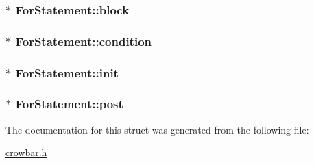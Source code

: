 \subsubsection[{block}]{$\ast$ For\+Statement\+::block}\label{struct_for_statement_a482b9507e4e7064b2a3449106528d422}
\hypertarget{struct_for_statement_ada11b70a235641ef62d953293d00d7ba}{}
\subsubsection[{condition}]{$\ast$ For\+Statement\+::condition}\label{struct_for_statement_ada11b70a235641ef62d953293d00d7ba}
\hypertarget{struct_for_statement_ad651b9f23924d2f0aa19d4269353b526}{}
\subsubsection[{init}]{$\ast$ For\+Statement\+::init}\label{struct_for_statement_ad651b9f23924d2f0aa19d4269353b526}
\hypertarget{struct_for_statement_a17a10be0a7696c064a0aa7e55e680903}{}
\subsubsection[{post}]{$\ast$ For\+Statement\+::post}\label{struct_for_statement_a17a10be0a7696c064a0aa7e55e680903}


The documentation for this struct was generated from the following file\+:\begin{DoxyCompactItemize}
\item 
\hyperlink{crowbar_8h}{crowbar.\+h}\end{DoxyCompactItemize}
